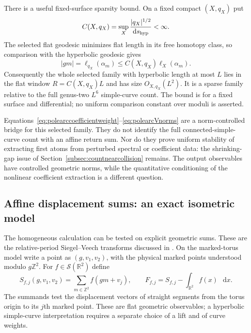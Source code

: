 \documentclass[11pt,a4paper]{article}
\numberwithin{equation}{section}
\theoremstyle{definition}
\theoremstyle{remark}
\newcommand{\dd}{\mathop{}\!\mathrm d}
\newcommand{\RR}{\mathbb R}
\newcommand{\ZZ}{\mathbb Z}
\begin{document}
There is a useful fixed-surface sparsity bound. On a fixed compact
$(X,q_X)$ put
\[
 C(X,q_X)=\sup_X\frac{|q_X|^{1/2}}{\dd s_{\rm hyp}}<\infty.
\]
The selected flat geodesic minimizes flat length in its free homotopy
class, so comparison with the hyperbolic geodesic gives
\[
 |gm|=\ell_{q_X}(\alpha_m)
 \leq C(X,q_X)\ell_X(\alpha_m).
\]
Consequently the whole selected family with hyperbolic length at most
$L$ lies in the flat window $R=C(X,q_X)L$ and has size
$O_{X,q_X}(L^2)$. It is a sparse family relative to the full genus-two
$L^6$ simple-curve count. The bound is for a fixed surface and
differential; no uniform comparison constant over moduli is asserted.

Equations~\eqref{eq:polearccoefficientweight}--\eqref{eq:polearcVnorms}
are a norm-controlled bridge for this selected family. They do not
identify the full connected-simple-curve count with an affine return
sum. Nor do they prove uniform stability of extracting first atoms from
perturbed spectral or coefficient data: the shrinking-gap issue of
Section~\ref{subsec:countnearcollision} remains. The output observables
have controlled geometric norms, while the quantitative conditioning of
the nonlinear coefficient extraction is a different question.

\subsection{Affine displacement sums: an exact isometric model}
\label{subsec:affinedisplacements}

The homogeneous calculation can be tested on explicit geometric sums.
These are the relative-period Siegel--Veech transforms discussed in
\cite[Section~6.1]{AthreyaLagaceMollerRaum}.
On the marked-torus model write a point as $(g,v_1,v_2)$, with the
physical marked points understood modulo $g\ZZ^2$. For
$f\in\mathscr S(\RR^2)$ define
\[
 S_{f,j}(g,v_1,v_2)=\sum_{m\in\ZZ^2}f(gm+v_j),\qquad
 F_{f,j}=S_{f,j}-\int_{\RR^2}f(x)\,\dd x.
\]
The summands test the displacement vectors of straight segments from
the torus origin to its $j$th marked point. These are flat geometric
observables; a hyperbolic simple-curve interpretation requires a
separate choice of a lift and of curve weights.
\end{document}
